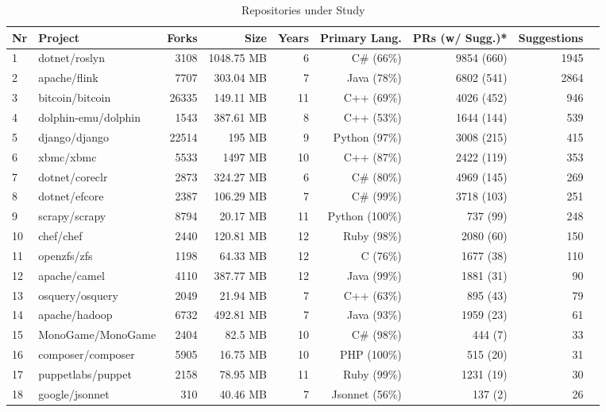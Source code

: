 \begin{table*}[b]
    \centering
    \caption{Repositories under Study}
    \begin{tabular}{llrr rrr rr}
    \toprule
         \textbf{Nr} & \textbf{Project} & \textbf{Forks} & \textbf{Size} & \textbf{Years} & \textbf{Primary Lang.} & \textbf{PRs (w/ Sugg.)*} & \textbf{Suggestions}\\
         \midrule
1 & dotnet/roslyn & 3108 & 1048.75 MB & 6 & C\# (66\%)  &9854  (660) & 1945 \\
2 & apache/flink & 7707 & 303.04 MB & 7 & Java (78\%)  & 6802 (541) & 2864 \\
3 & bitcoin/bitcoin & 26335 & 149.11 MB & 11 & C++ (69\%)  &4026  (452) & 946 \\
4 & dolphin-emu/dolphin & 1543 & 387.61 MB & 8 & C++ (53\%)  &1644  (144) & 539 \\
5 & django/django & 22514 & 195 MB & 9 & Python (97\%)  &3008 (215) & 415 \\
6 & xbmc/xbmc & 5533 & 1497 MB & 10 & C++ (87\%)  & 2422 (119) & 353 \\
7 & dotnet/coreclr & 2873 & 324.27 MB & 6 & C\# (80\%)  &4969  (145) & 269 \\
8 & dotnet/efcore & 2387 & 106.29 MB & 7 & C\# (99\%)  &3718  (103) & 251 \\
9 & scrapy/scrapy & 8794 & 20.17 MB & 11 & Python (100\%)  &737 (99) & 248 \\
10 & chef/chef & 2440 & 120.81 MB & 12 & Ruby (98\%)  &2080 (60) & 150 \\
11 & openzfs/zfs & 1198 & 64.33 MB & 12 & C (76\%)  &1677  (38) & 110 \\
12 & apache/camel & 4110 & 387.77 MB & 12 & Java (99\%)  &1881 (31) & 90 \\
13 & osquery/osquery & 2049 & 21.94 MB & 7 & C++ (63\%)  &895 (43)  & 79 \\
14 & apache/hadoop & 6732 & 492.81 MB & 7 & Java (93\%)  &1959  (23) & 61 \\
15 & MonoGame/MonoGame & 2404 & 82.5 MB & 10 & C\# (98\%)  &444  (7) & 33 \\
16 & composer/composer & 5905 & 16.75 MB & 10 & PHP (100\%) &515 (20) & 31 \\
17 & puppetlabs/puppet & 2158 & 78.95 MB & 11 & Ruby (99\%)  &1231  (19) & 30 \\
18 & google/jsonnet & 310 & 40.46 MB & 7 & Jsonnet (56\%)  &137  (2) & 26 \\

\end{tabular}
\end{table*}
